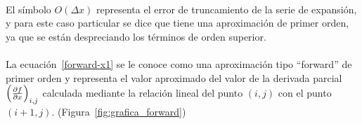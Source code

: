 \documentclass[letterpaper, openright, 12pt]{book}
\begin{document}
    \paragraph*{}
    El símbolo $O(\Delta x)$ representa el error de truncamiento de la serie de
    expansión, y para este caso particular se dice que tiene una aproximación de
    primer orden, ya que se están despreciando los términos de orden superior.

    \paragraph*{}
    La ecuación~\ref{forward-x1} se le conoce como una aproximación tipo
    ``forward'' de primer orden y representa el valor aproximado del valor de la
    derivada parcial $\left( \pdv{f}{x}\right)_{i,j}$ calculada mediante la
    relación lineal del punto $(i,j)$ con el punto $(i+1,j)$.
    (Figura~\ref{fig:grafica_forward})
\end{document}

